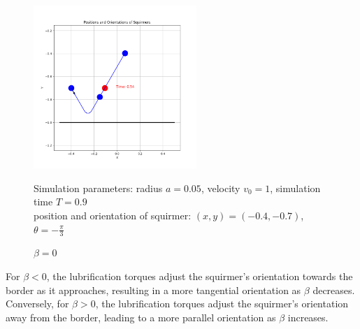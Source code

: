 \documentclass{article}
\begin{document}
\begin{figure}[H]
    \centering
    \includegraphics[width=0.55\textwidth]{graphs/simulations/border/beta0/mpi_3.png}
    \caption{\footnotesize $\beta = 0$}
    Simulation parameters: radius $a=0.05$, velocity $v_0=1$, simulation time $T=0.9$\\
        position and orientation of squirmer: $(x,y)=(-0.4,-0.7)$, $\theta=-\frac{\pi}{3}$
\end{figure}
For $\beta < 0$, the lubrification torques adjust the squirmer's orientation towards the border as it approaches, resulting
in a more tangential orientation as $\beta$ decreases. Conversely, for $\beta > 0$, the lubrification torques adjust the squirmer's 
orientation away from the border, leading to a more parallel orientation as $\beta$ increases.
\end{document}
